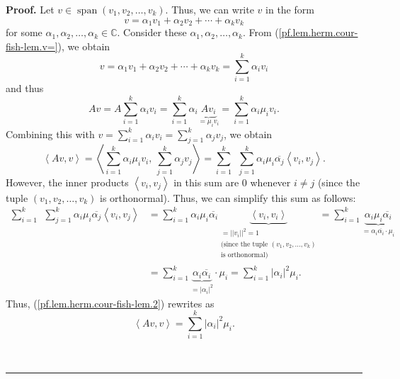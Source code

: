 \documentclass[numbers=enddot,12pt,final,onecolumn,notitlepage]{scrartcl}%
\numberwithin{exer}{subsection}
\theoremstyle{definition}
\newenvironment{proof}[1][Proof]{\noindent\textbf{#1.} }{\ \rule{0.5em}{0.5em}}
\let\sumnonlimits\sum
\renewcommand{\sum}{\sumnonlimits\limits}
\begin{document}
\begin{proof}
Let $v\in\operatorname*{span}\left(  v_{1},v_{2},\ldots,v_{k}\right)  $. Thus,
we can write $v$ in the form%
\begin{equation}
v=\alpha_{1}v_{1}+\alpha_{2}v_{2}+\cdots+\alpha_{k}v_{k}
\label{pf.lem.herm.cour-fish-lem.v=}%
\end{equation}
for some $\alpha_{1},\alpha_{2},\ldots,\alpha_{k}\in\mathbb{C}$. Consider
these $\alpha_{1},\alpha_{2},\ldots,\alpha_{k}$. From
(\ref{pf.lem.herm.cour-fish-lem.v=}), we obtain%
\[
v=\alpha_{1}v_{1}+\alpha_{2}v_{2}+\cdots+\alpha_{k}v_{k}=\sum_{i=1}^{k}%
\alpha_{i}v_{i}%
\]
and thus%
\[
Av=A\sum_{i=1}^{k}\alpha_{i}v_{i}=\sum_{i=1}^{k}\alpha_{i}\underbrace{Av_{i}%
}_{=\mu_{i}v_{i}}=\sum_{i=1}^{k}\alpha_{i}\mu_{i}v_{i}.
\]
Combining this with $v=\sum_{i=1}^{k}\alpha_{i}v_{i}=\sum_{j=1}^{k}\alpha
_{j}v_{j}$, we obtain%
\begin{equation}
\left\langle Av,v\right\rangle =\left\langle \sum_{i=1}^{k}\alpha_{i}\mu
_{i}v_{i},\ \sum_{j=1}^{k}\alpha_{j}v_{j}\right\rangle =\sum_{i=1}^{k}%
\ \ \sum_{j=1}^{k}\alpha_{i}\mu_{i}\overline{\alpha_{j}}\left\langle
v_{i},v_{j}\right\rangle . \label{pf.lem.herm.cour-fish-lem.2}%
\end{equation}
However, the inner products $\left\langle v_{i},v_{j}\right\rangle $ in this
sum are $0$ whenever $i\neq j$ (since the tuple $\left(  v_{1},v_{2}%
,\ldots,v_{k}\right)  $ is orthonormal). Thus, we can simplify this sum as
follows:%
\begin{align*}
\sum_{i=1}^{k}\ \ \sum_{j=1}^{k}\alpha_{i}\mu_{i}\overline{\alpha_{j}%
}\left\langle v_{i},v_{j}\right\rangle  &  =\sum_{i=1}^{k}\alpha_{i}\mu
_{i}\overline{\alpha_{i}}\underbrace{\left\langle v_{i},v_{i}\right\rangle
}_{\substack{=\left\vert \left\vert v_{i}\right\vert \right\vert
^{2}=1\\\text{(since the tuple }\left(  v_{1},v_{2},\ldots,v_{k}\right)
\\\text{is orthonormal)}}}=\sum_{i=1}^{k}\underbrace{\alpha_{i}\mu
_{i}\overline{\alpha_{i}}}_{=\alpha_{i}\overline{\alpha_{i}}\cdot\mu_{i}}\\
&  =\sum_{i=1}^{k}\underbrace{\alpha_{i}\overline{\alpha_{i}}}_{=\left\vert
\alpha_{i}\right\vert ^{2}}\cdot\mu_{i}=\sum_{i=1}^{k}\left\vert \alpha
_{i}\right\vert ^{2}\mu_{i}.
\end{align*}
Thus, (\ref{pf.lem.herm.cour-fish-lem.2}) rewrites as%
\begin{equation}
\left\langle Av,v\right\rangle =\sum_{i=1}^{k}\left\vert \alpha_{i}\right\vert
^{2}\mu_{i}. \label{pf.lem.herm.cour-fish-lem.3}%
\end{equation}



\end{proof}
\end{document}
